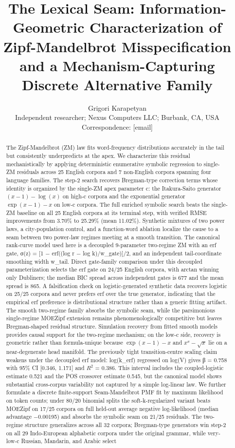 \documentclass[11pt]{article}
\title{The Lexical Seam: Information-Geometric Characterization of Zipf-Mandelbrot Misspecification and a Mechanism-Capturing Discrete Alternative Family}
\author{Grigori Karapetyan\\\small{Independent researcher; Nexus Computers LLC; Burbank, CA, USA}\\\small{Correspondence: [email]}}
\date{}
\begin{document}
        \maketitle

        \begin{abstract}
The Zipf-Mandelbrot (ZM) law fits word-frequency distributions accurately in the tail but consistently underpredicts at the apex. We characterize this residual mechanistically by applying deterministic enumerative symbolic regression to single-ZM residuals across 25 English corpora and 7 non-English corpora spanning four language families. The step-2 search recovers Bregman-type correction terms whose identity is organized by the single-ZM apex parameter c: the Itakura-Saito generator $(x-1)-\log(x)$ on high-c corpora and the exponential generator $\exp(x-1)-x$ on low-c corpora. The full enriched symbolic search beats the single-ZM baseline on all 25 English corpora at its terminal step, with verified RMSE improvements from 3.70\% to 25.29\% (mean 11.02\%). Synthetic mixtures of two power laws, a city-population control, and a function-word ablation localize the cause to a seam between two power-law regimes meeting at a smooth transition. The canonical rank-curve model used here is a decoupled 9-parameter two-regime ZM with an erf gate, σ(z) = [1 − erf((log r − log k)/w\_gate)]/2, and an independent tail-coordinate smoothing width w\_tail. Direct gate-family comparison under this decoupled parameterization selects the erf gate on 24/25 English corpora, with arctan winning only Dubliners; the median BIC spread across independent gates is 677 and the mean spread is 865. A falsification check on logistic-generated synthetic data recovers logistic on 25/25 corpora and never prefers erf over the true generator, indicating that the empirical erf preference is distributional structure rather than a generic fitting artifact. The smooth two-regime family absorbs the symbolic seam, while the parsimonious single-regime MOEZipf extension remains phenomenologically competitive but leaves Bregman-shaped residual structure. Simulation recovery from fitted smooth models provides causal support for the two-regime mechanism; on the low-c side, recovery is geometric rather than formula-unique because $\exp(x-1)-x$ and $x^x-\sqrt{x}$ lie on a near-degenerate head manifold. The previously tight transition-centre scaling claim weakens under the decoupled erf model: log(k\_erf) regressed on log(V) gives β = 0.758 with 95\% CI [0.346, 1.171] and $R^2$ = 0.386. This interval includes the coupled-logistic estimate 0.521 and the POS crossover estimate 0.545, but the canonical model shows substantial cross-corpus variability not captured by a simple log-linear law. We further formulate a discrete finite-support Seam-Mandelbrot PMF fit by maximum likelihood on token counts; under 80/20 binomial splits the soft-k-regularized variant beats MOEZipf on 17/25 corpora on full held-out average negative log-likelihood (median advantage −0.00195) and absorbs the symbolic seam on 21/25 residuals. The two-regime structure generalizes across all 32 corpora; Bregman-type generators win step-2 on all 29 Indo-European alphabetic corpora under the original grammar, while very-low-c Russian, Mandarin, and Arabic select 
\end{abstract}
\end{document}
